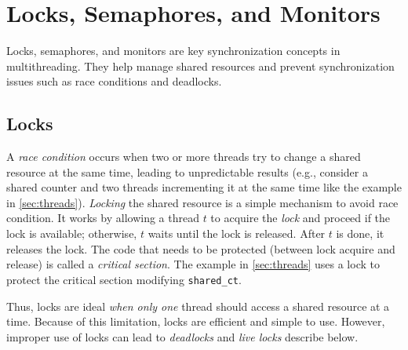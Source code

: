 \documentclass[oneside,11pt,dvipsnames]{book}
\newcommand{\code}[1]{\texttt{#1}}
\begin{document}
\section{Locks, Semaphores, and Monitors}

Locks, semaphores, and monitors are key synchronization concepts in multithreading. They help manage shared resources and prevent synchronization issues such as race conditions and deadlocks. 


\subsection{Locks}\label{sec:locks}
A \emph{race condition} occurs when two or more threads try to change a shared resource at the same time, leading to unpredictable results (e.g., consider a shared counter and two threads incrementing it at the same time like the example in \autoref{sec:threads}).
\emph{Locking} the shared resource is a simple mechanism to avoid race condition. It works by allowing a thread $t$ to acquire the \emph{lock} and proceed if the lock is available; otherwise, $t$ waits until the lock is released.  After $t$ is done, it releases the lock. The code that needs to be protected (between lock acquire and release) is called a \emph{critical section}.
The example in \autoref{sec:threads} uses a lock to protect the critical section modifying \code{shared\_ct}. 

Thus, locks are ideal \emph{when only one} thread should access a shared resource at a time. Because of this limitation, locks are efficient and simple to use. However, improper use of locks can lead to \emph{deadlocks} and \emph{live locks} describe below.
\end{document}
